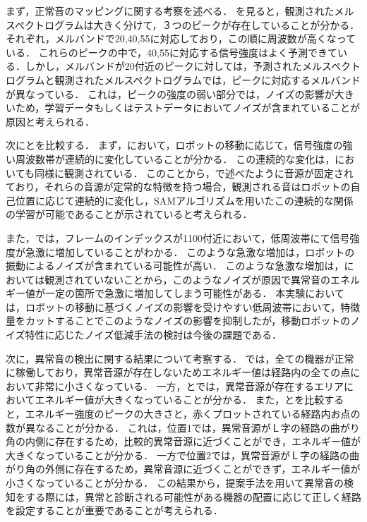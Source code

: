 \documentclass[../main]{subfiles}
\begin{document}
まず，正常音のマッピングに関する考察を述べる．
を見ると，観測されたメルスペクトログラムは大きく分けて，３つのピークが存在していることが分かる．
それぞれ，メルバンドで20,40,55に対応しており，この順に周波数が高くなっている．
これらのピークの中で，40,55に対応する信号強度はよく予測できている．しかし，メルバンドが20付近のピークに対しては，予測されたメルスペクトログラムと観測されたメルスペクトログラムでは，ピークに対応するメルバンドが異なっている．
これは，ピークの強度の弱い部分では，ノイズの影響が大きいため，学習データもしくはテストデータにおいてノイズが含まれていることが原因と考えられる．

次にとを比較する．
まず，において，ロボットの移動に応じて，信号強度の強い周波数帯が連続的に変化していることが分かる．
この連続的な変化は，においても同様に観測されている．
このことから，で述べたように音源が固定されており，それらの音源が定常的な特徴を持つ場合，観測される音はロボットの自己位置に応じて連続的に変化し，SAMアルゴリズムを用いたこの連続的な関係の学習が可能であることが示されていると考えられる．

また，では，フレームのインデックスが1100付近において，低周波帯にて信号強度が急激に増加していることがわかる．
このような急激な増加は，ロボットの振動によるノイズが含まれている可能性が高い．
このような急激な増加は，においては観測されていないことから，このようなノイズが原因で異常音のエネルギー値が一定の箇所で急激に増加してしまう可能性がある．
本実験においては，ロボットの移動に基づくノイズの影響を受けやすい低周波帯において，特徴量をカットすることでこのようなノイズの影響を抑制したが，移動ロボットのノイズ特性に応じたノイズ低減手法の検討は今後の課題である．

次に，異常音の検出に関する結果について考察する．
では，全ての機器が正常に稼働しており，異常音源が存在しないためエネルギー値は経路内の全ての点において非常に小さくなっている．
一方，とでは，異常音源が存在するエリアにおいてエネルギー値が大きくなっていることが分かる．
また，とを比較すると，エネルギー強度のピークの大きさと，赤くプロットされている経路内お点の数が異なることが分かる．
これは，位置1では，異常音源がＬ字の経路の曲がり角の内側に存在するため，比較的異常音源に近づくことができ，エネルギー値が大きくなっていることが分かる．
一方で位置2では，異常音源がＬ字の経路の曲がり角の外側に存在するため，異常音源に近づくことができず，エネルギー値が小さくなっていることが分かる．
この結果から，提案手法を用いて異常音の検知をする際には，異常と診断される可能性がある機器の配置に応じて正しく経路を設定することが重要であることが考えられる．
\end{document}
